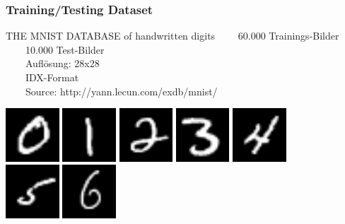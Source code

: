 \documentclass[xcolor=pdftex,dvipsnames,table]{beamer}
\newcommand{\tabitem}{~~\llap{\textbullet}~~}
\begin{document}
	\begin{frame}
		\frametitle{Training/Testing Dataset}
		\begin{block}{THE MNIST DATABASE of handwritten digits}
		\tabitem 60.000 Trainings-Bilder\\
		\tabitem 10.000 Test-Bilder\\
		\tabitem Auflösung: 28x28\\
		\tabitem IDX-Format\\
		\tabitem Source: http://yann.lecun.com/exdb/mnist/
		\end{block}
		\includegraphics[width=0.15\textwidth]{trainings_sample_example_0.png}
		\includegraphics[width=0.15\textwidth]{trainings_sample_example_1.png}
		\includegraphics[width=0.15\textwidth]{trainings_sample_example_2.png}
		\includegraphics[width=0.15\textwidth]{trainings_sample_example_3.png}
		\includegraphics[width=0.15\textwidth]{trainings_sample_example_4.png}\\
		\includegraphics[width=0.15\textwidth]{trainings_sample_example_5.png}
		\includegraphics[width=0.15\textwidth]{trainings_sample_example_6.png}

\end{frame}
\end{document}
